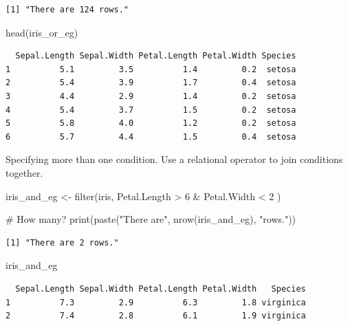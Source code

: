 \documentclass[
  letterpaper,
  DIV=11,
  numbers=noendperiod]{scrreprt}
\newenvironment{Shaded}{\begin{snugshade}}{\end{snugshade}}
\newcommand{\CommentTok}[1]{\textcolor[rgb]{0.37,0.37,0.37}{#1}}
\newcommand{\DecValTok}[1]{\textcolor[rgb]{0.68,0.00,0.00}{#1}}
\newcommand{\FunctionTok}[1]{\textcolor[rgb]{0.28,0.35,0.67}{#1}}
\newcommand{\NormalTok}[1]{\textcolor[rgb]{0.00,0.23,0.31}{#1}}
\newcommand{\OtherTok}[1]{\textcolor[rgb]{0.00,0.23,0.31}{#1}}
\newcommand{\SpecialCharTok}[1]{\textcolor[rgb]{0.37,0.37,0.37}{#1}}
\newcommand{\StringTok}[1]{\textcolor[rgb]{0.13,0.47,0.30}{#1}}
\begin{document}
\begin{verbatim}
[1] "There are 124 rows."
\end{verbatim}

\begin{Shaded}
\begin{Highlighting}[]
\FunctionTok{head}\NormalTok{(iris\_or\_eg)}
\end{Highlighting}
\end{Shaded}

\begin{verbatim}
  Sepal.Length Sepal.Width Petal.Length Petal.Width Species
1          5.1         3.5          1.4         0.2  setosa
2          5.4         3.9          1.7         0.4  setosa
3          4.4         2.9          1.4         0.2  setosa
4          5.4         3.7          1.5         0.2  setosa
5          5.8         4.0          1.2         0.2  setosa
6          5.7         4.4          1.5         0.4  setosa
\end{verbatim}

Specifying more than one condition. Use a relational operator to join
conditions together.

\begin{Shaded}
\begin{Highlighting}[]
\NormalTok{iris\_and\_eg }\OtherTok{\textless{}{-}} \FunctionTok{filter}\NormalTok{(iris, Petal.Length }\SpecialCharTok{\textgreater{}} \DecValTok{6} \SpecialCharTok{\&}\NormalTok{ Petal.Width }\SpecialCharTok{\textless{}} \DecValTok{2}\NormalTok{ )}

\CommentTok{\# How many?}
\FunctionTok{print}\NormalTok{(}\FunctionTok{paste}\NormalTok{(}\StringTok{"There are"}\NormalTok{, }\FunctionTok{nrow}\NormalTok{(iris\_and\_eg), }\StringTok{"rows."}\NormalTok{))}
\end{Highlighting}
\end{Shaded}

\begin{verbatim}
[1] "There are 2 rows."
\end{verbatim}

\begin{Shaded}
\begin{Highlighting}[]
\NormalTok{iris\_and\_eg}
\end{Highlighting}
\end{Shaded}

\begin{verbatim}
  Sepal.Length Sepal.Width Petal.Length Petal.Width   Species
1          7.3         2.9          6.3         1.8 virginica
2          7.4         2.8          6.1         1.9 virginica
\end{verbatim}
\end{document}
